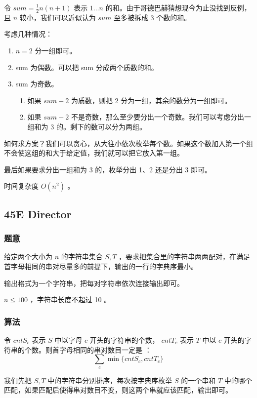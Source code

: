 \documentclass[11pt]{article}
\begin{document}
    令 $sum = \frac{1}{2} n(n + 1)$ 表示 $1 \dots n$ 的和。由于哥德巴赫猜想现今为止没找到反例，且 $n$ 较小，我们可以近似认为 $sum$ 至多被拆成 3 个数的和。

    考虑几种情况：
\begin{enumerate}
\item $n = 2$ 分一组即可。
\item sum 为偶数。可以把 sum 分成两个质数的和。
\item sum 为奇数。
\begin{enumerate}
\item 如果 $sum - 2$ 为质数，则把 2 分为一组，其余的数分为一组即可。
\item 如果 $sum - 2$ 不是奇数，那么至少要分出一个奇数。我们可以考虑分出一组和为 3 的。剩下的数可以分为两组。
\end{enumerate}
\end{enumerate}

    如何求方案？我们可以贪心，从大往小依次枚举每个数。如果这个数加入第一个组不会使这组的和大于给定值，我们就可以把它放入第一组。

    最后如果要求分出一组和为 3 的，枚举分出 1、2 还是分出 3 即可。

    时间复杂度 $O(n^2)$ 。
\subsection{45E   Director}
\label{sec-3-8}
\subsubsection{题意}
\label{sec-3-8-1}

    给定两个大小为 $n$ 的字符串集合 $S, T$ ，要求把集合里的字符串两两配对，在满足首字母相同的串对尽量多的前提下，输出的一行的字典序最小。

    输出格式为一个字符串，把每对字符串依次连接输出即可。

    $n \leq 100$ ，字符串长度不超过 10 。
\subsubsection{算法}
\label{sec-3-8-2}

    令 $cntS_c$ 表示 $S$ 中以字母 $c$ 开头的字符串的个数， $cntT_c$ 表示 $T$ 中以 $c$ 开头的字符串的个数。则首字母相同的串对数目一定是 ：
    $$\sum_c \min\{cntS_c, cntT_c\}$$

    我们先把 $S, T$ 中的字符串分别排序，每次按字典序枚举 $S$ 的一个串和 $T$ 中的哪个匹配，如果匹配后使得串对数目不变，则这两个串就应该匹配，输出即可。
\end{document}

